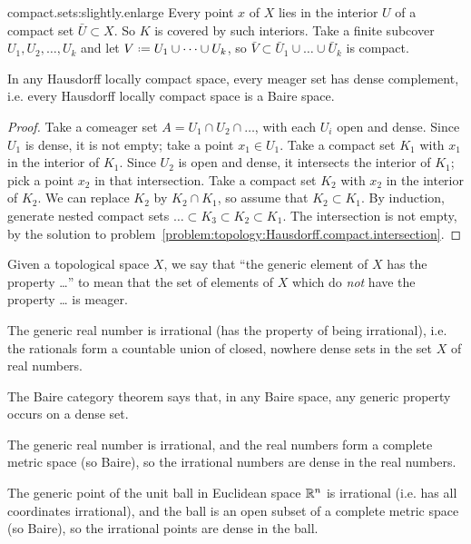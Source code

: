\begin{answer}{compact.sets:slightly.enlarge}
Every point \(x\) of \(X\) lies in the interior \(U\) of a compact set \(\bar{U} \subset X\).
So \(K\) is covered by such interiors.
Take a finite subcover \(U_1, U_2,\dots, U_k\) and let \(V\defeq U_1 \cup \dots \cup U_k\), so \(\bar{V} \subset \bar{U}_1 \cup \dots \cup \bar{U}_k\) is compact.
\end{answer}
\begin{theorem}
In any Hausdorff locally compact space, every meager set has dense complement, i.e. every Hausdorff locally compact space is a Baire space.
\end{theorem}
\begin{proof}
Take a comeager set \(A=U_1 \cap U_2 \cap \dots\), with each \(U_i\) open and dense.
Since \(U_1\) is dense, it is not empty; take a point \(x_1 \in U_1\).
Take a compact set \(K_1\) with \(x_1\) in the interior of \(K_1\).
Since \(U_2\) is open and dense, it intersects the interior of \(K_1\); pick a point \(x_2\) in that intersection.
Take a compact set \(K_2\) with \(x_2\) in the interior of \(K_2\).
We can replace \(K_2\) by \(K_2 \cap K_1\), so assume that \(K_2 \subset K_1\).
By induction, generate nested compact sets \(\dots \subset K_3 \subset K_2 \subset K_1\).
The intersection is not empty, by the solution to problem~\vref{problem:topology:Hausdorff.compact.intersection}.
\end{proof}
Given a topological space \(X\), we say that ``the generic element of \(X\) has the property \dots'' to mean that the set of elements of \(X\) which do \emph{not} have the property \dots {} is  meager.
\begin{example}
The generic real number is irrational (has the property of being irrational), i.e. the rationals form a countable union of closed, nowhere dense sets in the set \(X\) of real numbers.
\end{example}
The Baire category theorem says that, in any Baire space, any generic property occurs on a dense set.
\begin{example}
The generic real number is irrational, and the real numbers form a complete metric space (so Baire), so the irrational numbers are dense in the real numbers.
\end{example}
\begin{example}
The generic point of the unit ball in Euclidean space \(\mathbb{R}^{n}\) is irrational (i.e. has all coordinates irrational), and the ball is an open subset of a complete metric space (so Baire), so the irrational points are dense in the ball.
\end{example}

